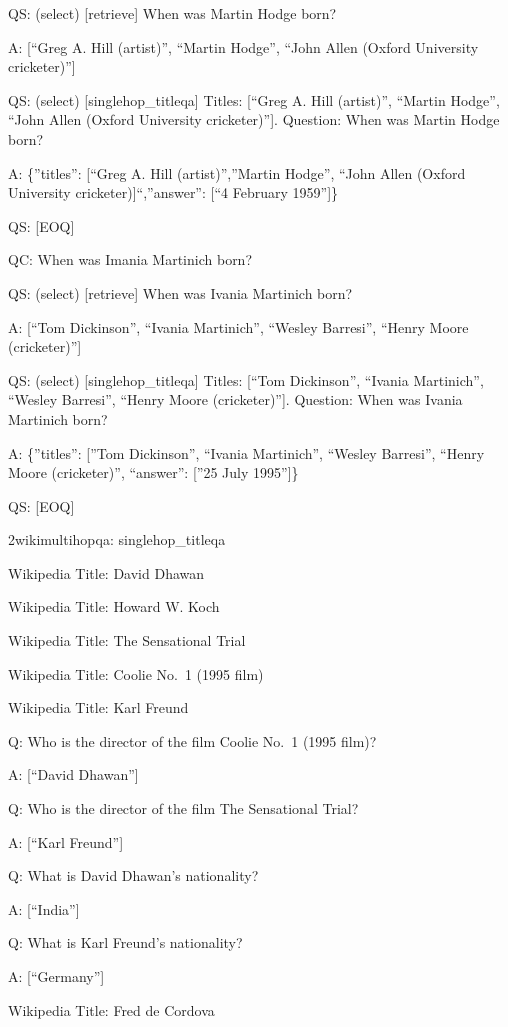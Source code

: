 \documentclass[
]{article}
\begin{document}
QS: (select) {[}retrieve{]} When was Martin Hodge born?

A: {[}``Greg A. Hill (artist)'', ``Martin Hodge'', ``John Allen (Oxford
University cricketer)''{]}

QS: (select) {[}singlehop\_titleqa{]} Titles: {[}``Greg A. Hill
(artist)'', ``Martin Hodge'', ``John Allen (Oxford University
cricketer)''{]}. Question: When was Martin Hodge born?

A: \{''titles'': {[}``Greg A. Hill (artist)'',''Martin Hodge'', ``John
Allen (Oxford University cricketer){]}``,''answer'': {[}``4 February
1959''{]}\}

QS: {[}EOQ{]}

QC: When was Imania Martinich born?

QS: (select) {[}retrieve{]} When was Ivania Martinich born?

A: {[}``Tom Dickinson'', ``Ivania Martinich'', ``Wesley Barresi'',
``Henry Moore (cricketer)''{]}

QS: (select) {[}singlehop\_titleqa{]} Titles: {[}``Tom Dickinson'',
``Ivania Martinich'', ``Wesley Barresi'', ``Henry Moore
(cricketer)''{]}. Question: When was Ivania Martinich born?

A: \{''titles'': {[}''Tom Dickinson'', ``Ivania Martinich'', ``Wesley
Barresi'', ``Henry Moore (cricketer)'', ``answer'': {[}''25 July
1995''{]}\}

QS: {[}EOQ{]}

2wikimultihopqa: singlehop\_titleqa

Wikipedia Title: David Dhawan

Wikipedia Title: Howard W. Koch

Wikipedia Title: The Sensational Trial

Wikipedia Title: Coolie No.~1 (1995 film)

Wikipedia Title: Karl Freund

Q: Who is the director of the film Coolie No.~1 (1995 film)?

A: {[}``David Dhawan''{]}

Q: Who is the director of the film The Sensational Trial?

A: {[}``Karl Freund''{]}

Q: What is David Dhawan's nationality?

A: {[}``India''{]}

Q: What is Karl Freund's nationality?

A: {[}``Germany''{]}

Wikipedia Title: Fred de Cordova
\end{document}
